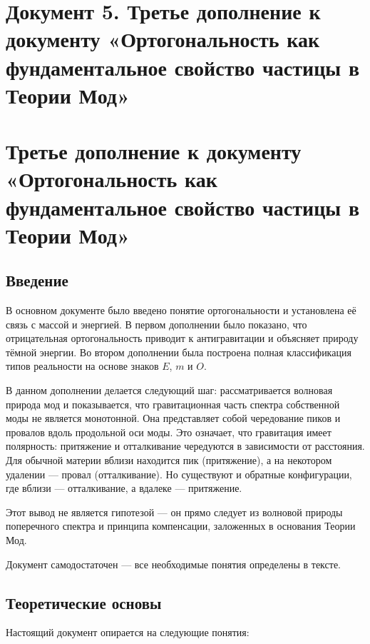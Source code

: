 \documentclass[12pt,a4paper]{article}
\begin{document}
\newpage
\section*{Документ 5. Третье дополнение к документу «Ортогональность как фундаментальное свойство частицы в Теории Мод»}

\section{Третье дополнение к документу «Ортогональность как фундаментальное свойство частицы в Теории Мод»}

\subsection{Введение}
В основном документе было введено понятие ортогональности и установлена её связь с массой и энергией. В первом дополнении было показано, что отрицательная ортогональность приводит к антигравитации и объясняет природу тёмной энергии. Во втором дополнении была построена полная классификация типов реальности на основе знаков $E$, $m$ и $O$.

В данном дополнении делается следующий шаг: рассматривается волновая природа мод и показывается, что гравитационная часть спектра собственной моды не является монотонной. Она представляет собой чередование пиков и провалов вдоль продольной оси моды. Это означает, что гравитация имеет полярность: притяжение и отталкивание чередуются в зависимости от расстояния. Для обычной материи вблизи находится пик (притяжение), а на некотором удалении --- провал (отталкивание). Но существуют и обратные конфигурации, где вблизи --- отталкивание, а вдалеке --- притяжение.

Этот вывод не является гипотезой --- он прямо следует из волновой природы поперечного спектра и принципа компенсации, заложенных в основания Теории Мод.

Документ самодостаточен --- все необходимые понятия определены в тексте.

\subsection{Теоретические основы}
Настоящий документ опирается на следующие понятия:
\end{document}
